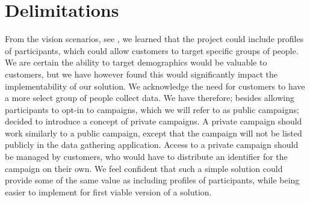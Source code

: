 \section{Delimitations}
\label{sec:delimitations}
From the vision scenarios, see , we learned that the project could include profiles of participants, which could allow customers to target specific groups of people. We are certain the ability to target demographics would be valuable to customers, but we have however found this would significantly impact the implementability of our solution. We acknowledge the need for customers to have a more select group of people collect data. We have therefore; besides allowing participants to opt-in to campaigns, which we will refer to as public campaigns; decided to introduce a concept of private campaigns. A private campaign should work similarly to a public campaign, except that the campaign will not be listed publicly in the data gathering application. Access to a private campaign should be managed by customers, who would have to distribute an identifier for the campaign on their own. We feel confident that such a simple solution could provide some of the same value as including profiles of participants, while being easier to implement for first viable version of a solution.

